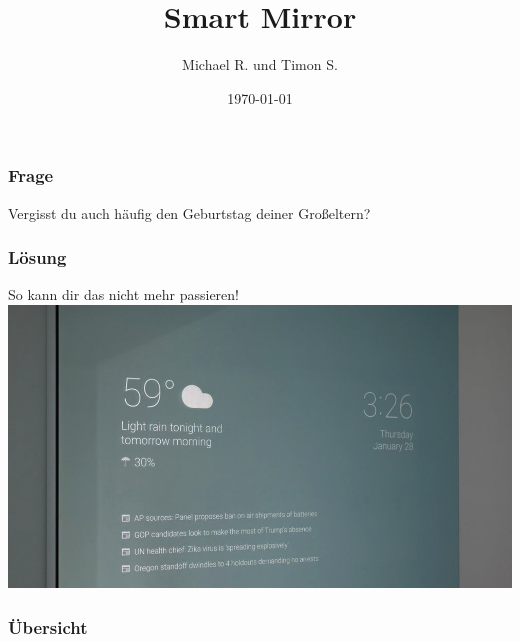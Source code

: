 \documentclass[11pt]{beamer}
\begin{document}
	\author{Michael R. und Timon S.}
	\title{Smart Mirror}
	\date{\today}
	
	\begin{frame}
		\titlepage
	\end{frame}

	\begin{frame}
		\frametitle{Frage}
		\centering
		\huge
		\vfill
		Vergisst du auch h\"aufig den Geburtstag deiner Großeltern?
		\vfill
	\end{frame}

	\begin{frame}
		\frametitle{L\"osung}
		\centering
		\Large
		So kann dir das nicht mehr passieren!
		\includegraphics[width = .7\paperwidth]{images/showcaseImage}
	\end{frame}

	\begin{frame}
		\frametitle{Übersicht}
		\tableofcontents
	\end{frame}
\end{document}
